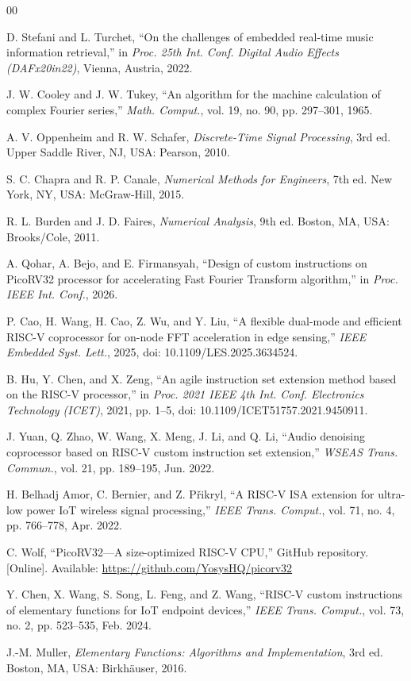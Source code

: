 \documentclass[conference]{IEEEtran}
\begin{document}
\begin{thebibliography}{00}

D. Stefani and L. Turchet, ``On the challenges of embedded real-time music information retrieval,'' in \textit{Proc. 25th Int. Conf. Digital Audio Effects (DAFx20in22)}, Vienna, Austria, 2022.

J. W. Cooley and J. W. Tukey, ``An algorithm for the machine calculation of complex Fourier series,'' \textit{Math. Comput.}, vol. 19, no. 90, pp. 297--301, 1965.

A. V. Oppenheim and R. W. Schafer, \textit{Discrete-Time Signal Processing}, 3rd ed. Upper Saddle River, NJ, USA: Pearson, 2010.

S. C. Chapra and R. P. Canale, \textit{Numerical Methods for Engineers}, 7th ed. New York, NY, USA: McGraw-Hill, 2015.

R. L. Burden and J. D. Faires, \textit{Numerical Analysis}, 9th ed. Boston, MA, USA: Brooks/Cole, 2011.

A. Qohar, A. Bejo, and E. Firmansyah, ``Design of custom instructions on PicoRV32 processor for accelerating Fast Fourier Transform algorithm,'' in \textit{Proc. IEEE Int. Conf.}, 2026.

P. Cao, H. Wang, H. Cao, Z. Wu, and Y. Liu, ``A flexible dual-mode and efficient RISC-V coprocessor for on-node FFT acceleration in edge sensing,'' \textit{IEEE Embedded Syst. Lett.}, 2025, doi: 10.1109/LES.2025.3634524.

B. Hu, Y. Chen, and X. Zeng, ``An agile instruction set extension method based on the RISC-V processor,'' in \textit{Proc. 2021 IEEE 4th Int. Conf. Electronics Technology (ICET)}, 2021, pp. 1--5, doi: 10.1109/ICET51757.2021.9450911.

J. Yuan, Q. Zhao, W. Wang, X. Meng, J. Li, and Q. Li, ``Audio denoising coprocessor based on RISC-V custom instruction set extension,'' \textit{WSEAS Trans. Commun.}, vol. 21, pp. 189--195, Jun. 2022.

H. Belhadj Amor, C. Bernier, and Z. P\v{r}ikryl, ``A RISC-V ISA extension for ultra-low power IoT wireless signal processing,'' \textit{IEEE Trans. Comput.}, vol. 71, no. 4, pp. 766--778, Apr. 2022.

C. Wolf, ``PicoRV32---A size-optimized RISC-V CPU,'' GitHub repository. [Online]. Available: \url{https://github.com/YosysHQ/picorv32}

Y. Chen, X. Wang, S. Song, L. Feng, and Z. Wang, ``RISC-V custom instructions of elementary functions for IoT endpoint devices,'' \textit{IEEE Trans. Comput.}, vol. 73, no. 2, pp. 523--535, Feb. 2024.

J.-M. Muller, \textit{Elementary Functions: Algorithms and Implementation}, 3rd ed. Boston, MA, USA: Birkh\"auser, 2016.

\end{thebibliography}
\end{document}
